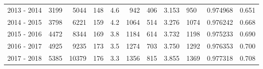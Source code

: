 \begin{tabular}{lrrrrrrrllr}
2013 - 2014 &     3199 &     5044 &               148 &               4.6 &                     942 &                        406 &       3.153 &           950 &   0.974968 &             0.651 \\
2014 - 2015 &     3798 &     6221 &               159 &               4.2 &                    1064 &                        514 &       3.276 &          1074 &   0.976242 &             0.668 \\
2015 - 2016 &     4472 &     8344 &               169 &               3.8 &                    1184 &                        614 &       3.732 &          1198 &   0.975233 &             0.690 \\
2016 - 2017 &     4925 &     9235 &               173 &               3.5 &                    1274 &                        703 &       3.750 &          1292 &   0.976353 &             0.700 \\
2017 - 2018 &     5385 &    10379 &               176 &               3.3 &                    1356 &                        815 &       3.855 &          1369 &   0.977318 &             0.708 \\
\bottomrule
\end{tabular}
